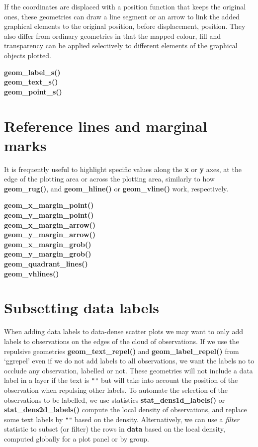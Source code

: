 \documentclass[DIV=25,a3,landscape,9pt]{scrartcl}\usepackage[]{graphicx}\usepackage[]{xcolor}
\begin{document}
\begin{multicols}{3}
If the coordinates are displaced with a position function that keeps the original ones, these geometries can draw a line segment or an arrow to link the added graphical elements to the original position, before displacement, position. They also differ from ordinary geometries in that the mapped colour, fill and transparency can be applied selectively to different elements of the graphical objects plotted.\vspace{1ex}

\noindent
\textbf{geom\_label\_s()}\\
\textbf{geom\_text\_s()}\\
\textbf{geom\_point\_s()}

\section*{Reference lines and marginal marks}

It is frequently useful to highlight specific values along the \textbf{x} or \textbf{y} axes, at the edge of the plotting area or across the plotting area, similarly to how \textbf{geom\_rug()}, and \textbf{geom\_hline()} or \textbf{geom\_vline()} work, respectively.\vspace{1ex}

\noindent
\textbf{geom\_x\_margin\_point()}\\
\textbf{geom\_y\_margin\_point()}\\
\textbf{geom\_x\_margin\_arrow()}\\
\textbf{geom\_y\_margin\_arrow()}\\
\textbf{geom\_x\_margin\_grob()}\\
\textbf{geom\_y\_margin\_grob()}\\
\textbf{geom\_quadrant\_lines()}\\
\textbf{geom\_vhlines()}

\section*{Subsetting data labels}

When adding data labels to data-dense scatter plots we may want to only add labels to observations on the edges of the cloud of observations. If we use the repulsive geometries \textbf{geom\_text\_repel()} and \textbf{geom\_label\_repel()} from `ggrepel' even if we do not add labels to all observations, we want the labels no to occlude any observation, labelled or not. These geometries will not include a data label in a layer if the text is \texttt{""} but will take into account the position of the observation when repulsing other labels. To automate the selection of the observations to be labelled, we use statistics \textbf{stat\_dens1d\_labels()} or \textbf{stat\_dens2d\_labels()} compute the local density of observations, and replace some text labels by \texttt{""} based on the density. Alternatively, we can use a \emph{filter} statistic to subset (or filter) the rows in \textbf{data} based on the local density, computed globally for a plot panel or by group.\vspace{1ex}


\end{multicols}
\end{document}
